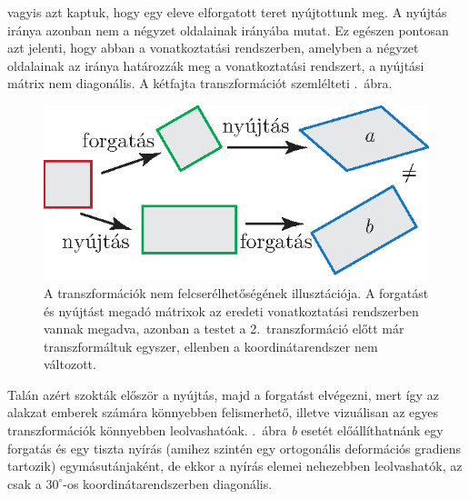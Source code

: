 \documentclass[12pt,a4paper]{scrartcl}
\begin{document}
vagyis azt kaptuk, hogy egy eleve elforgatott teret nyújtottunk meg. A nyújtás iránya azonban nem a négyzet oldalainak irányába mutat. Ez egészen pontosan azt jelenti, hogy abban a vonatkoztatási rendszerben, amelyben a négyzet oldalainak az iránya határozzák meg a vonatkoztatási rendszert, a nyújtási mátrix nem diagonális. A kétfajta transzformációt szemlélteti .\ ábra.
\normalsize

\begin{figure}[htb] 
\centering    
\includegraphics[scale=1]{figs/nem_kommutativ.eps}
\caption[Nem kommutatív transzformációk]{A transzformációk nem felcserélhetőségének illusztációja. A forgatást és nyújtást megadó mátrixok az eredeti vonatkoztatási rendszerben vannak megadva, azonban a testet a 2.\ transzformáció előtt már transzformáltuk egyszer, ellenben a koordinátarendszer nem változott.}
\label{fig:nem_kommutativ}
\end{figure}

Talán azért szokták először a nyújtás, majd a forgatást elvégezni, mert így az alakzat emberek számára könnyebben felismerhető, illetve vizuálisan az egyes transzformációk könnyebben leolvashatóak. .\ ábra \textit{b} esetét előállíthatnánk egy forgatás és egy tiszta nyírás (amihez szintén egy ortogonális deformációs gradiens tartozik) egymásutánjaként, de ekkor a nyírás elemei nehezebben leolvashatók, az csak a $30^\circ$-os koordinátarendszerben diagonális.

\footnotesize
\end{document}
